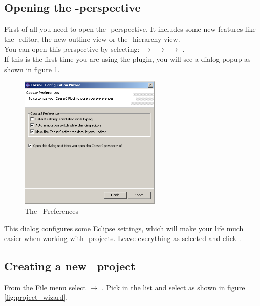 \subsection{Opening the \caesarj -perspective}
First of all you need to open the \caesarj -perspective. It includes some new features like the \caesar -editor, the new outline view or the \caesarj -hierarchy view.\\
You can open this perspective by selecting:  $\rightarrow$  $\rightarrow$  $\rightarrow$ .\\
If this is the first time you are using the plugin, you will see a dialog popup as shown in figure \ref{fig:view_properties}.

\begin{figure}[htbp]
	\centering
		\includegraphics[width=0.60\textwidth]{images/view_properties.png}
	\caption{The \caesarj ~Preferences}	
	\label{fig:view_properties}
\end{figure}

This dialog configures some Eclipse settings, which will make your life much easier when
working with \caesarj -projects. Leave everything as selected and click
.

\newpage
\subsection{Creating a new \caesarj ~project \label{creating_project}}
From the File menu select  $\rightarrow$ . Pick  in the list and select  as shown in figure \ref{fig:project_wizard}.


